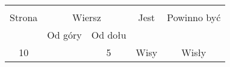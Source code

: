 \documentclass[a4paper,11pt]{article}
\begin{document}
\vspace{\spaceTwo}








\begin{center}
  \begin{tabular}{|c|c|c|c|c|}
    \hline
    & \multicolumn{2}{c|}{} & & \\
    Strona & \multicolumn{2}{c|}{Wiersz} & Jest
                              & Powinno być \\ \cline{2-3}
    & Od góry & Od dołu & & \\
    \hline
    10 & & 5 & Wisy & Wisły \\
    \hline
  \end{tabular}
\end{center}

\vspace{\spaceTwo}



\end{document}
